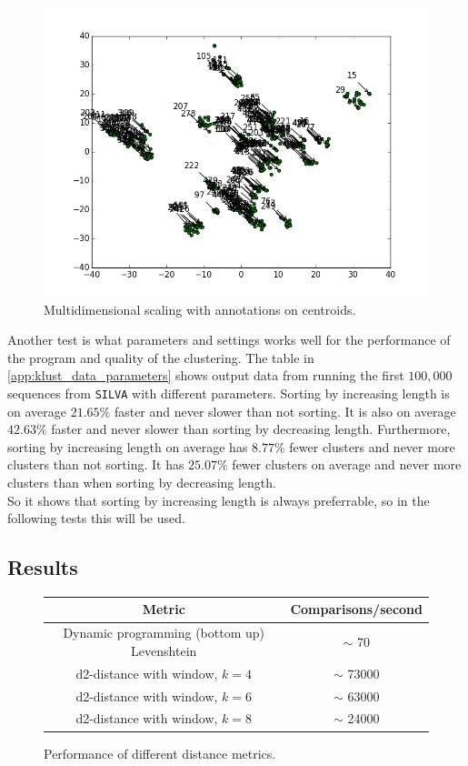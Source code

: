 \begin{figure}[h!]
  \centering
  \includegraphics[width=\textwidth]{graphics/MDS_t-SNE_SILVA_500.png}
  \caption{Multidimensional scaling with annotations on centroids.}
  \label{fig:mds_tsne}
\end{figure}

Another test is what parameters and settings works well for the performance of
the program and quality of the clustering. The table in
\ref{app:klust_data_parameters} shows output data from running the first
$100,000$ sequences from \texttt{SILVA} with different parameters. Sorting by
increasing length is on average $21.65\%$ faster and never slower than not
sorting. It is also on average $42.63\%$ faster and never slower than sorting
by decreasing length. Furthermore, sorting by increasing length on average has
$8.77\%$ fewer clusters and never more clusters than not sorting. It has
$25.07\%$ fewer clusters on average and never more clusters than when sorting
by decreasing length. \\
So it shows that sorting by increasing length is always preferrable, so in the following tests this will be used.

\subsection{Results}
\begin{figure}[H]
  \centering
  \begin{tabular}{ c | c }
    Metric                                        & Comparisons/second      \\
    \hline \hline
    Dynamic programming (bottom up) Levenshtein   & $\sim$ 70               \\
    \hline
    d2-distance with window, $k=4$                & $\sim$ 73000            \\
    \hline
    d2-distance with window, $k=6$                & $\sim$ 63000            \\
    \hline
    d2-distance with window, $k=8$                & $\sim$ 24000            \\
  \end{tabular}
  \caption{Performance of different distance metrics.}
\end{figure}

